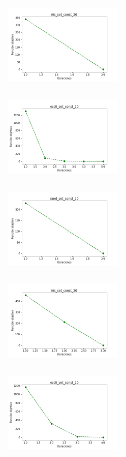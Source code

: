 \newpage

\begin{figure}[H]
    \centering
    \begin{subfigure}
        \centering
        \includegraphics[width=0.32\textwidth]{img/copkm2/iris_set_const_20_949004259_cost.png}
    \end{subfigure}
    \hfill
    \begin{subfigure}
        \centering
        \includegraphics[width=0.32\textwidth]{img/copkm2/ecoli_set_const_20_949004259_cost.png}
    \end{subfigure}
    \hfill
    \begin{subfigure}
        \centering
        \includegraphics[width=0.32\textwidth]{img/copkm2/rand_set_const_20_949004259_cost.png}
    \end{subfigure}
    \hfill
    \begin{subfigure}
        \centering
        \includegraphics[width=0.32\textwidth]{img/copkm2/iris_set_const_20_589741062_cost.png}
    \end{subfigure}
    \hfill
    \begin{subfigure}
        \centering
        \includegraphics[width=0.32\textwidth]{img/copkm2/ecoli_set_const_20_589741062_cost.png}

\end{subfigure}
\end{figure}
